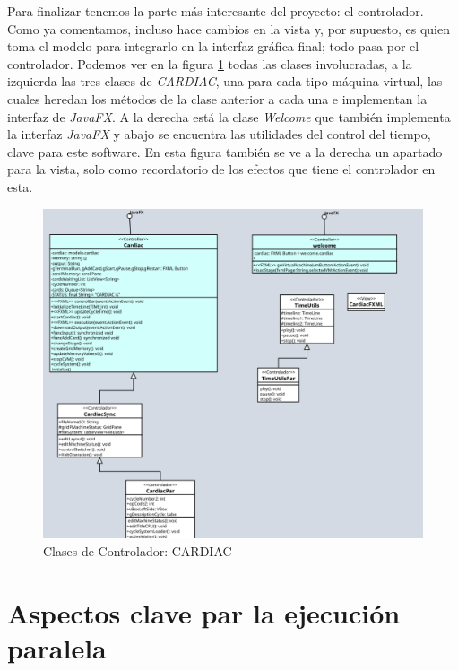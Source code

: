 \documentclass[letterpaper,12pt,oneside]{book}
\begin{document}
	Para finalizar tenemos la parte más interesante del proyecto: el controlador. Como ya comentamos, incluso hace cambios en la vista y, por supuesto, es
	quien toma el modelo para integrarlo en la interfaz gráfica final; todo pasa por el controlador. Podemos ver en la figura \ref{fig:controlador_clases_cardiac}
	todas las clases involucradas, a la izquierda las tres clases de \textit{CARDIAC}, una para cada tipo máquina virtual, las cuales
	heredan los métodos de la clase anterior a cada una e implementan la interfaz de \textit{JavaFX}. A la derecha está la clase
	\textit{Welcome} que  también implementa la interfaz \textit{JavaFX} y abajo se encuentra las utilidades del control del tiempo, clave
	para este software. En esta figura también se ve a la derecha un apartado para la vista, solo como recordatorio de los efectos que tiene el controlador en esta.
	
	
	\begin{figure}[h]		
				\centering
				\includegraphics[scale=0.6]{media/anexoSoftware/clases_controladorVista.png}
				\caption{Clases de Controlador: CARDIAC}
				\label{fig:controlador_clases_cardiac}
	\end{figure}
	
	
	
	\section{Aspectos clave par la ejecución paralela}
	
\end{document}
